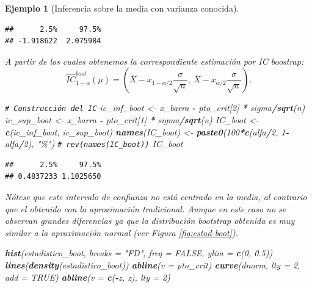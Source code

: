 \documentclass[
]{book}
\newenvironment{Shaded}{\begin{snugshade}}{\end{snugshade}}
\newcommand{\AttributeTok}[1]{\textcolor[rgb]{0.13,0.29,0.53}{#1}}
\newcommand{\CommentTok}[1]{\textcolor[rgb]{0.56,0.35,0.01}{\textit{#1}}}
\newcommand{\ConstantTok}[1]{\textcolor[rgb]{0.56,0.35,0.01}{#1}}
\newcommand{\DecValTok}[1]{\textcolor[rgb]{0.00,0.00,0.81}{#1}}
\newcommand{\FloatTok}[1]{\textcolor[rgb]{0.00,0.00,0.81}{#1}}
\newcommand{\FunctionTok}[1]{\textcolor[rgb]{0.13,0.29,0.53}{\textbf{#1}}}
\newcommand{\NormalTok}[1]{#1}
\newcommand{\OtherTok}[1]{\textcolor[rgb]{0.56,0.35,0.01}{#1}}
\newcommand{\SpecialCharTok}[1]{\textcolor[rgb]{0.81,0.36,0.00}{\textbf{#1}}}
\newcommand{\StringTok}[1]{\textcolor[rgb]{0.31,0.60,0.02}{#1}}
\theoremstyle{break}
\newtheorem{example}{Ejemplo}[chapter]
\theoremstyle{nonumberplain}
\renewcommand{\CommentTok}[1]{\textcolor[rgb]{0.41,0.41,0.41}{\texttt{#1}}}
\begin{document}
\begin{example}[Inferencia sobre la media con varianza conocida]
\begin{verbatim}
##      2.5%     97.5% 
## -1.918622  2.075984
\end{verbatim}

A partir de los cuales obtenemos la correspondiente estimación por IC
boostrap:
\[\hat{IC}^{boot}_{1-\alpha}\left(  \mu\right)  = 
\left(  \overline{X}-x_{1-\alpha/2}\dfrac{\sigma}{\sqrt{n}},\ \overline{X} 
- x_{\alpha/2}\dfrac{\sigma}{\sqrt{n}} \right).\]

\begin{Shaded}
\begin{Highlighting}[]
\CommentTok{\# Construcción del IC}
\NormalTok{ic\_inf\_boot }\OtherTok{\textless{}{-}}\NormalTok{ x\_barra }\SpecialCharTok{{-}}\NormalTok{ pto\_crit[}\DecValTok{2}\NormalTok{] }\SpecialCharTok{*}\NormalTok{ sigma}\SpecialCharTok{/}\FunctionTok{sqrt}\NormalTok{(n)}
\NormalTok{ic\_sup\_boot }\OtherTok{\textless{}{-}}\NormalTok{ x\_barra }\SpecialCharTok{{-}}\NormalTok{ pto\_crit[}\DecValTok{1}\NormalTok{] }\SpecialCharTok{*}\NormalTok{ sigma}\SpecialCharTok{/}\FunctionTok{sqrt}\NormalTok{(n)}
\NormalTok{IC\_boot }\OtherTok{\textless{}{-}} \FunctionTok{c}\NormalTok{(ic\_inf\_boot, ic\_sup\_boot)}
\FunctionTok{names}\NormalTok{(IC\_boot) }\OtherTok{\textless{}{-}} \FunctionTok{paste0}\NormalTok{(}\DecValTok{100}\SpecialCharTok{*}\FunctionTok{c}\NormalTok{(alfa}\SpecialCharTok{/}\DecValTok{2}\NormalTok{, }\DecValTok{1}\SpecialCharTok{{-}}\NormalTok{alfa}\SpecialCharTok{/}\DecValTok{2}\NormalTok{), }\StringTok{"\%"}\NormalTok{) }\CommentTok{\# rev(names(IC\_boot))}
\NormalTok{IC\_boot}
\end{Highlighting}
\end{Shaded}

\begin{verbatim}
##      2.5%     97.5% 
## 0.4837233 1.1025650
\end{verbatim}

Nótese que este intervalo de confianza no está centrado en la media,
al contrario que el obtenido con la aproximación tradicional.
Aunque en este caso no se observan grandes diferencias ya que
la distribución bootstrap obtenida es muy similar a la aproximación normal
(ver Figura \ref{fig:estad-boot}).

\begin{Shaded}
\begin{Highlighting}[]
\FunctionTok{hist}\NormalTok{(estadistico\_boot, }\AttributeTok{breaks =} \StringTok{"FD"}\NormalTok{, }\AttributeTok{freq =} \ConstantTok{FALSE}\NormalTok{, }\AttributeTok{ylim =} \FunctionTok{c}\NormalTok{(}\DecValTok{0}\NormalTok{, }\FloatTok{0.5}\NormalTok{))}
\FunctionTok{lines}\NormalTok{(}\FunctionTok{density}\NormalTok{(estadistico\_boot))}
\FunctionTok{abline}\NormalTok{(}\AttributeTok{v =}\NormalTok{ pto\_crit)}
\FunctionTok{curve}\NormalTok{(dnorm, }\AttributeTok{lty =} \DecValTok{2}\NormalTok{, }\AttributeTok{add =} \ConstantTok{TRUE}\NormalTok{)}
\FunctionTok{abline}\NormalTok{(}\AttributeTok{v =} \FunctionTok{c}\NormalTok{(}\SpecialCharTok{{-}}\NormalTok{z, z), }\AttributeTok{lty =} \DecValTok{2}\NormalTok{)}
\end{Highlighting}
\end{Shaded}


\end{example}
\end{document}

